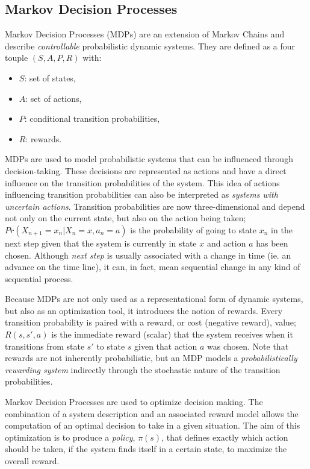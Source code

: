 \subsection{Markov Decision Processes}
\label{subsec:mdp}

Markov Decision Processes (MDPs) are an extension of Markov Chains and describe \textit{controllable} probabilistic dynamic systems. They are defined as a four touple $(S,A,P,R)$ with:
\begin{itemize}
\item $S$: set of states,
\item $A$: set of actions,
\item $P$: conditional transition probabilities,
\item $R$: rewards.
\end{itemize}

MDPs are used to model probabilistic systems that can be influenced through decision-taking. These decisions are represented as actions and have a direct influence on the transition probabilities of the system. This idea of actions influencing transition probabilities can also be interpreted as \textit{systems with uncertain actions}. Transition probabilities are now three-dimensional and depend not only on the current state, but also on the action being taken; $Pr(X_{n+1}=x_n|X_n=x,a_n=a)$ is the probability of going to state $x_n$ in the next step given that the system is currently in state $x$ and action $a$ has been chosen. Although \textit{next step} is usually associated with a change in time (ie. an advance on the time line), it can, in fact, mean sequential change in any kind of sequential process.

Because MDPs are not only used as a representational form of dynamic systems, but also as an optimization tool, it introduces the notion of rewards. Every transition probability is paired with a reward, or cost (negative reward), value; $R(s,s',a)$ is the immediate reward (scalar) that the system receives when it transitions from state $s'$ to state $s$ given that action $a$ was chosen. Note that rewards are not inherently probabilistic, but an MDP models a \textit{probabilistically rewarding system} indirectly through the stochastic nature of the transition probabilities.

Markov Decision Processes are used to optimize decision making. The combination of a system description and an associated reward model allows the computation of an optimal decision to take in a given situation. The aim of this optimization is to produce a \textit{policy}, $\pi(s)$, that defines exactly which action should be taken, if the system finds itself in a certain state, to maximize the overall reward.

